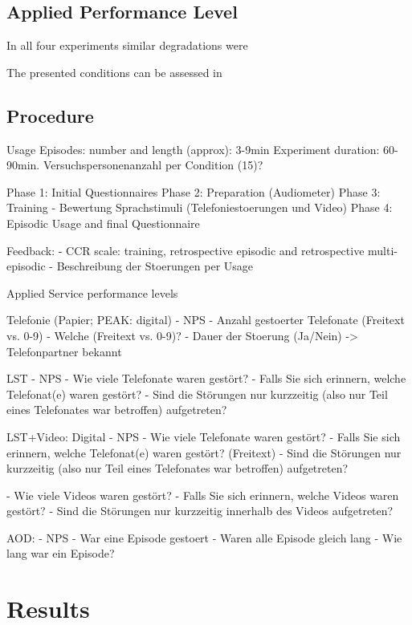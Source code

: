 \subsection{Applied Performance Level}
In all four experiments similar degradations were 

The presented conditions can be assessed in 


\subsection{Procedure} %

Usage Episodes: number and length (approx): 3-9min
Experiment duration: 60-90min.
Versuchspersonenanzahl per Condition (15)?

Phase 1: Initial Questionnaires
Phase 2: Preparation (Audiometer)
Phase 3: Training - Bewertung Sprachstimuli (Telefoniestoerungen und Video)
Phase 4: Episodic Usage and final Questionnaire

Feedback:
- CCR scale: training, retrospective episodic and retrospective multi-episodic 
- Beschreibung der Stoerungen per Usage

Applied Service performance levels

Telefonie (Papier; PEAK: digital)
- NPS
- Anzahl gestoerter Telefonate (Freitext vs. 0-9)
- Welche (Freitext vs. 0-9)?
- Dauer der Stoerung (Ja/Nein)
-> Telefonpartner bekannt

LST
- NPS
- Wie viele Telefonate waren gestört?
- Falls Sie sich erinnern, welche Telefonat(e) waren gestört?
- Sind die Störungen nur kurzzeitig (also nur Teil eines Telefonates war betroffen) aufgetreten?

LST+Video: Digital
- NPS
- Wie viele Telefonate waren gestört? 
- Falls Sie sich erinnern, welche Telefonat(e) waren gestört? (Freitext)
- Sind die Störungen nur kurzzeitig (also nur Teil eines Telefonates war betroffen) aufgetreten?

- Wie viele Videos waren gestört?
- Falls Sie sich erinnern, welche Videos waren gestört?
- Sind die Störungen nur kurzzeitig innerhalb des Videos aufgetreten?

AOD:
- NPS
- War eine Episode gestoert
- Waren alle Episode gleich lang
- Wie lang war ein Episode?

\section{Results}
